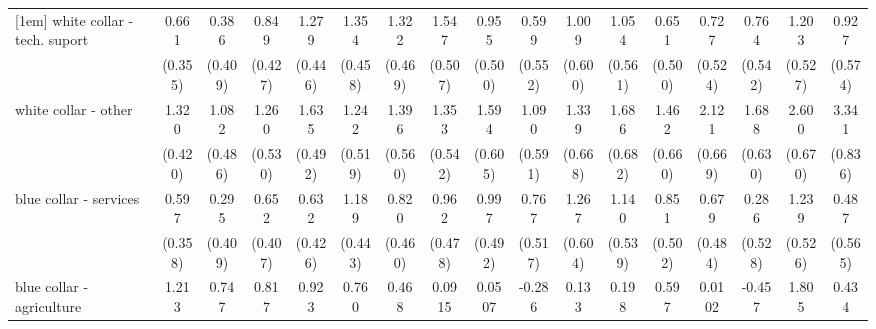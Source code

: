 {\begin{tabular}{l*{16}{c}}
[1em]
white collar - tech. suport&       0.661         &       0.386         &       0.849\sym{*}  &       1.279\sym{**} &       1.354\sym{**} &       1.322\sym{**} &       1.547\sym{**} &       0.955         &       0.599         &       1.009         &       1.054         &       0.651         &       0.727         &       0.764         &       1.203\sym{*}  &       0.927         \\
                    &     (0.355)         &     (0.409)         &     (0.427)         &     (0.446)         &     (0.458)         &     (0.469)         &     (0.507)         &     (0.500)         &     (0.552)         &     (0.600)         &     (0.561)         &     (0.500)         &     (0.524)         &     (0.542)         &     (0.527)         &     (0.574)         \\
[1em]
white collar - other&       1.320\sym{**} &       1.082\sym{*}  &       1.260\sym{*}  &       1.635\sym{***}&       1.242\sym{*}  &       1.396\sym{*}  &       1.353\sym{*}  &       1.594\sym{**} &       1.090         &       1.339\sym{*}  &       1.686\sym{*}  &       1.462\sym{*}  &       2.121\sym{**} &       1.688\sym{**} &       2.600\sym{***}&       3.341\sym{***}\\
                    &     (0.420)         &     (0.486)         &     (0.530)         &     (0.492)         &     (0.519)         &     (0.560)         &     (0.542)         &     (0.605)         &     (0.591)         &     (0.668)         &     (0.682)         &     (0.660)         &     (0.669)         &     (0.630)         &     (0.670)         &     (0.836)         \\
[1em]
blue collar - services&       0.597         &       0.295         &       0.652         &       0.632         &       1.189\sym{**} &       0.820         &       0.962\sym{*}  &       0.997\sym{*}  &       0.767         &       1.267\sym{*}  &       1.140\sym{*}  &       0.851         &       0.679         &       0.286         &       1.239\sym{*}  &       0.487         \\
                    &     (0.358)         &     (0.409)         &     (0.407)         &     (0.426)         &     (0.443)         &     (0.460)         &     (0.478)         &     (0.492)         &     (0.517)         &     (0.604)         &     (0.539)         &     (0.502)         &     (0.484)         &     (0.528)         &     (0.526)         &     (0.565)         \\
[1em]
blue collar - agriculture&       1.213\sym{*}  &       0.747         &       0.817         &       0.923         &       0.760         &       0.468         &      0.0915         &      0.0507         &      -0.286         &       0.133         &       0.198         &       0.597         &      0.0102         &      -0.457         &       1.805\sym{*}  &       0.434         \\

\end{tabular}}
